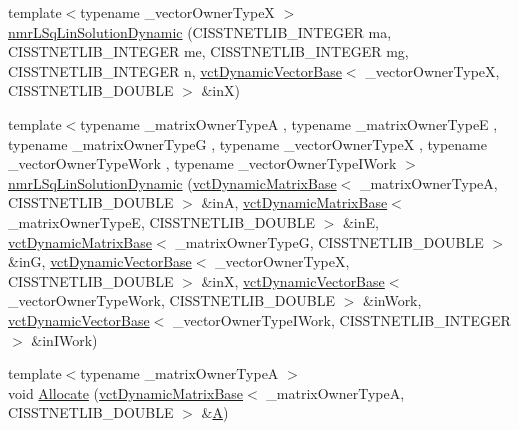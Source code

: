 \begin{DoxyCompactItemize}
\item 
{\footnotesize template$<$typename \+\_\+vector\+Owner\+Type\+X $>$ }\\\hyperlink{classnmr_l_sq_lin_solution_dynamic_abd390bd1b755696811ed69deb5aa37b7}{nmr\+L\+Sq\+Lin\+Solution\+Dynamic} (C\+I\+S\+S\+T\+N\+E\+T\+L\+I\+B\+\_\+\+I\+N\+T\+E\+G\+E\+R ma, C\+I\+S\+S\+T\+N\+E\+T\+L\+I\+B\+\_\+\+I\+N\+T\+E\+G\+E\+R me, C\+I\+S\+S\+T\+N\+E\+T\+L\+I\+B\+\_\+\+I\+N\+T\+E\+G\+E\+R mg, C\+I\+S\+S\+T\+N\+E\+T\+L\+I\+B\+\_\+\+I\+N\+T\+E\+G\+E\+R n, \hyperlink{classvct_dynamic_vector_base}{vct\+Dynamic\+Vector\+Base}$<$ \+\_\+vector\+Owner\+Type\+X, C\+I\+S\+S\+T\+N\+E\+T\+L\+I\+B\+\_\+\+D\+O\+U\+B\+L\+E $>$ \&in\+X)
\item 
{\footnotesize template$<$typename \+\_\+matrix\+Owner\+Type\+A , typename \+\_\+matrix\+Owner\+Type\+E , typename \+\_\+matrix\+Owner\+Type\+G , typename \+\_\+vector\+Owner\+Type\+X , typename \+\_\+vector\+Owner\+Type\+Work , typename \+\_\+vector\+Owner\+Type\+I\+Work $>$ }\\\hyperlink{classnmr_l_sq_lin_solution_dynamic_a282557f13b6bc5752d1d9bd5856f0747}{nmr\+L\+Sq\+Lin\+Solution\+Dynamic} (\hyperlink{classvct_dynamic_matrix_base}{vct\+Dynamic\+Matrix\+Base}$<$ \+\_\+matrix\+Owner\+Type\+A, C\+I\+S\+S\+T\+N\+E\+T\+L\+I\+B\+\_\+\+D\+O\+U\+B\+L\+E $>$ \&in\+A, \hyperlink{classvct_dynamic_matrix_base}{vct\+Dynamic\+Matrix\+Base}$<$ \+\_\+matrix\+Owner\+Type\+E, C\+I\+S\+S\+T\+N\+E\+T\+L\+I\+B\+\_\+\+D\+O\+U\+B\+L\+E $>$ \&in\+E, \hyperlink{classvct_dynamic_matrix_base}{vct\+Dynamic\+Matrix\+Base}$<$ \+\_\+matrix\+Owner\+Type\+G, C\+I\+S\+S\+T\+N\+E\+T\+L\+I\+B\+\_\+\+D\+O\+U\+B\+L\+E $>$ \&in\+G, \hyperlink{classvct_dynamic_vector_base}{vct\+Dynamic\+Vector\+Base}$<$ \+\_\+vector\+Owner\+Type\+X, C\+I\+S\+S\+T\+N\+E\+T\+L\+I\+B\+\_\+\+D\+O\+U\+B\+L\+E $>$ \&in\+X, \hyperlink{classvct_dynamic_vector_base}{vct\+Dynamic\+Vector\+Base}$<$ \+\_\+vector\+Owner\+Type\+Work, C\+I\+S\+S\+T\+N\+E\+T\+L\+I\+B\+\_\+\+D\+O\+U\+B\+L\+E $>$ \&in\+Work, \hyperlink{classvct_dynamic_vector_base}{vct\+Dynamic\+Vector\+Base}$<$ \+\_\+vector\+Owner\+Type\+I\+Work, C\+I\+S\+S\+T\+N\+E\+T\+L\+I\+B\+\_\+\+I\+N\+T\+E\+G\+E\+R $>$ \&in\+I\+Work)
\item 
{\footnotesize template$<$typename \+\_\+matrix\+Owner\+Type\+A $>$ }\\void \hyperlink{classnmr_l_sq_lin_solution_dynamic_a1b78d0a3a3131dd1d50290bf4987bb18}{Allocate} (\hyperlink{classvct_dynamic_matrix_base}{vct\+Dynamic\+Matrix\+Base}$<$ \+\_\+matrix\+Owner\+Type\+A, C\+I\+S\+S\+T\+N\+E\+T\+L\+I\+B\+\_\+\+D\+O\+U\+B\+L\+E $>$ \&\hyperlink{classnmr_l_sq_lin_solution_dynamic_aa4a41abac141e2e55dd5cafb59169dfd}{A})

\end{DoxyCompactItemize}
